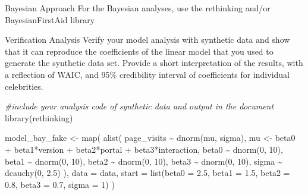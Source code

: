 \documentclass[
  ignorenonframetext,
]{beamer}
\newenvironment{Shaded}{\begin{snugshade}}{\end{snugshade}}
\newcommand{\AttributeTok}[1]{\textcolor[rgb]{0.77,0.63,0.00}{#1}}
\newcommand{\CommentTok}[1]{\textcolor[rgb]{0.56,0.35,0.01}{\textit{#1}}}
\newcommand{\DecValTok}[1]{\textcolor[rgb]{0.00,0.00,0.81}{#1}}
\newcommand{\FloatTok}[1]{\textcolor[rgb]{0.00,0.00,0.81}{#1}}
\newcommand{\FunctionTok}[1]{\textcolor[rgb]{0.00,0.00,0.00}{#1}}
\newcommand{\NormalTok}[1]{#1}
\newcommand{\OtherTok}[1]{\textcolor[rgb]{0.56,0.35,0.01}{#1}}
\newcommand{\SpecialCharTok}[1]{\textcolor[rgb]{0.00,0.00,0.00}{#1}}
\begin{document}
\begin{frame}[fragile]{Bayesian Approach}
\protect\hypertarget{bayesian-approach-1}{}
For the Bayesian analyses, use the rethinking and/or BayesianFirstAid
library

\begin{block}{Verification Analysis}
\protect\hypertarget{verification-analysis}{}
Verify your model analysis with synthetic data and show that it can
reproduce the coefficients of the linear model that you used to generate
the synthetic data set. Provide a short interpretation of the results,
with a reflection of WAIC, and 95\% credibility interval of coefficients
for individual celebrities.

\begin{Shaded}
\begin{Highlighting}[]
\CommentTok{\#include your analysis code of synthetic data and output in the document}
\FunctionTok{library}\NormalTok{(rethinking)}

\NormalTok{model\_bay\_fake }\OtherTok{\textless{}{-}} \FunctionTok{map}\NormalTok{(}
  \FunctionTok{alist}\NormalTok{(}
\NormalTok{    page\_visits }\SpecialCharTok{\textasciitilde{}} \FunctionTok{dnorm}\NormalTok{(mu, sigma),}
\NormalTok{    mu }\OtherTok{\textless{}{-}}\NormalTok{ beta0 }\SpecialCharTok{+}\NormalTok{ beta1}\SpecialCharTok{*}\NormalTok{version }\SpecialCharTok{+}\NormalTok{ beta2}\SpecialCharTok{*}\NormalTok{portal }\SpecialCharTok{+}\NormalTok{ beta3}\SpecialCharTok{*}\NormalTok{interaction,}
\NormalTok{    beta0 }\SpecialCharTok{\textasciitilde{}} \FunctionTok{dnorm}\NormalTok{(}\DecValTok{0}\NormalTok{, }\DecValTok{10}\NormalTok{),}
\NormalTok{    beta1 }\SpecialCharTok{\textasciitilde{}} \FunctionTok{dnorm}\NormalTok{(}\DecValTok{0}\NormalTok{, }\DecValTok{10}\NormalTok{),}
\NormalTok{    beta2 }\SpecialCharTok{\textasciitilde{}} \FunctionTok{dnorm}\NormalTok{(}\DecValTok{0}\NormalTok{, }\DecValTok{10}\NormalTok{),}
\NormalTok{    beta3 }\SpecialCharTok{\textasciitilde{}} \FunctionTok{dnorm}\NormalTok{(}\DecValTok{0}\NormalTok{, }\DecValTok{10}\NormalTok{),}
\NormalTok{    sigma }\SpecialCharTok{\textasciitilde{}} \FunctionTok{dcauchy}\NormalTok{(}\DecValTok{0}\NormalTok{, }\FloatTok{2.5}\NormalTok{)}
\NormalTok{  ),}
  \AttributeTok{data =}\NormalTok{ data,}
  \AttributeTok{start =} \FunctionTok{list}\NormalTok{(}\AttributeTok{beta0 =} \FloatTok{2.5}\NormalTok{, }\AttributeTok{beta1 =} \FloatTok{1.5}\NormalTok{, }\AttributeTok{beta2 =} \FloatTok{0.8}\NormalTok{, }\AttributeTok{beta3 =} \FloatTok{0.7}\NormalTok{, }\AttributeTok{sigma =} \DecValTok{1}\NormalTok{)}
\NormalTok{)}



\end{Highlighting}
\end{Shaded}
\end{block}
\end{frame}
\end{document}
